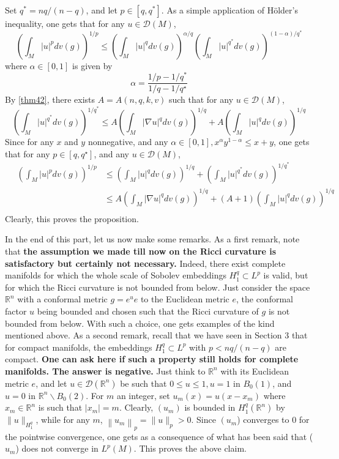 \documentclass[12pt,hyperref,a4paper,UTF8]{ctexart}
\begin{document}
\begin{Proof}
Set $q^*=n q /(n-q)$, and let $p \in\left[q, q^*\right]$. As a simple application of Hölder's inequality, one gets that for any $u \in \mathcal{D}(M)$,
$$
\left(\int_M|u|^p d v(g)\right)^{1 / p} \leq\left(\int_M|u|^q d v(g)\right)^{\alpha / q}\left(\int_M|u|^{q^*} d v(g)\right)^{(1-\alpha) / q^*}
$$
where $\alpha \in[0,1]$ is given by
$$
\alpha=\frac{1 / p-1 / q^*}{1 / q-1 / q^{\star}}
$$
By \autoref{thm42}, there exists $A=A(n, q, k, v)$ such that for any $u \in \mathcal{D}(M)$,
$$
\left(\int_M|u|^{q^*} d v(g)\right)^{1 / q^*} \leq A\left(\int_M|\nabla u|^q d v(g)\right)^{1 / q}+A\left(\int_M|u|^q d v(g)\right)^{1 / q}
$$
Since for any $x$ and $y$ nonnegative, and any $\alpha \in[0,1], x^\alpha y^{1-\alpha} \leq x+y$, one gets that for any $p \in\left[q, q^{\star}\right]$, and any $u \in \mathcal{D}(M)$,
$$
\begin{aligned}
\quad \left(\int_M|u|^p d v(g)\right)^{1 / p} &\leq\left(\int_M|u|^q d v(g)\right)^{1 / q}+\left(\int_M|u|^{q^*} d v(g)\right)^{1 / q^*} \\
&\leq A\left(\int_M|\nabla u|^q d v(g)\right)^{1 / q}+(A+1)\left(\int_M|u|^q d v(g)\right)^{1 / q}\\
\end{aligned}
$$
Clearly, this proves the proposition.
\end{Proof}

\vskip 3pt
In the end of this part, let us now make some remarks. 
As a first remark, note that \textbf{the assumption we made till now on the Ricci curvature is satisfactory but certainly not necessary.} Indeed, there exist complete manifolds for which the whole scale of Sobolev embeddings $H_1^q \subset L^p$ is valid, but for which the Ricci curvature is not bounded from below. Just consider the space $\mathbb{R}^n$ with a conformal metric $g=e^u e$ to the Euclidean metric $e$, the conformal factor $u$ being bounded and chosen such that the Ricci curvature of $g$ is not bounded from below. With such a choice, one gets examples of the kind mentioned above. 
As a second remark, recall that we have seen in Section 3 that for compact manifolds, the embeddings $H_1^q \subset L^p$ with $p<n q /(n-q)$ are compact. \textbf{One can ask here if such a property still holds for complete manifolds. The answer is negative.} Just think to $\mathbb{R}^n$ with its Euclidean metric $e$, and let $u \in \mathcal{D}\left(\mathbb{R}^n\right)$ be such that $0 \leq u \leq 1, u=1$ in $B_0(1)$, and $u=0$ in $\mathbb{R}^n \backslash B_0(2)$. For $m$ an integer, set $u_m(x)=u\left(x-x_m\right)$ where $x_m \in \mathbb{R}^n$ is such that $\left|x_m\right|=m$. 
Clearly, $\left(u_m\right)$ is bounded in $H_1^q\left(\mathbb{R}^n\right)$ by $\|u\|_{H_1^q}$, while for any $m$, $\left\|u_m\right\|_p=\|u\|_p>0$. Since $\left(u_m\right.$) converges to 0 for the pointwise convergence, one gets as a consequence of what has been said that ($u_m$) does not converge in $L^p(M)$. This proves the above claim. 
\end{document}
